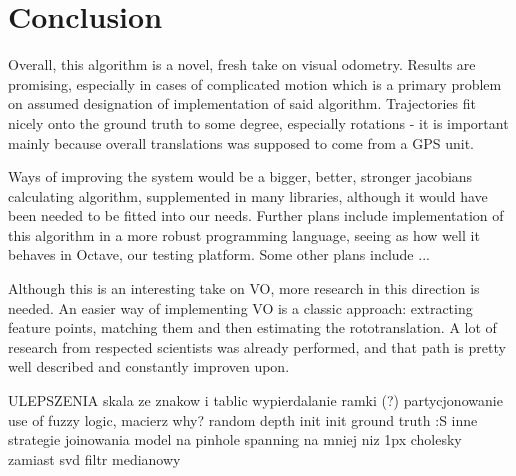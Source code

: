 \chapter{Conclusion}

Overall, this algorithm is a novel, fresh take on visual odometry. Results are promising, especially in cases of complicated motion which is a primary problem on assumed designation of implementation of said algorithm. Trajectories fit nicely onto the ground truth to some degree, especially rotations - it is important mainly because overall translations was supposed to come from a GPS unit.

Ways of improving the system would be a bigger, better, stronger jacobians calculating algorithm, supplemented in many libraries, although it would have been needed to be fitted into our needs. Further plans include implementation of this algorithm in a more robust programming language, seeing as how well it behaves in Octave, our testing platform. Some other plans include ...

Although this is an interesting take on VO, more research in this direction is needed. An easier way of implementing VO is a classic approach: extracting feature points, matching them and then estimating the rototranslation. A lot of research from respected scientists was already performed, and that path is pretty well described and constantly improven upon.


ULEPSZENIA
skala ze znakow i tablic
wypierdalanie ramki (?)
partycjonowanie
use of fuzzy logic, macierz why?
random depth init
init ground truth :S
inne strategie joinowania
model na pinhole
spanning na mniej niz 1px
cholesky zamiast svd
filtr medianowy

